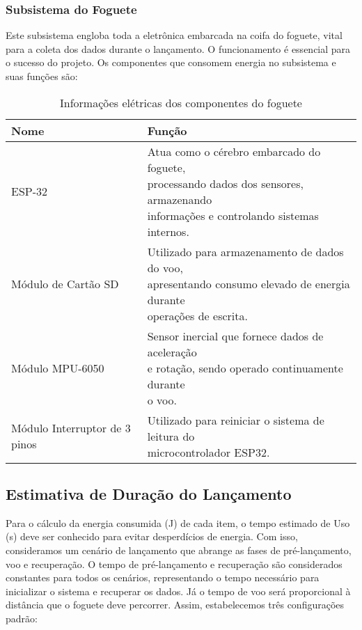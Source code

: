 \subsubsection{Subsistema do Foguete}

Este subsistema engloba toda a eletrônica embarcada na coifa do foguete, vital para a coleta dos dados durante o lançamento. O funcionamento é essencial para o sucesso do projeto. Os componentes que consomem energia no subsistema e suas funções são: 

\begin{table}[H]
    \centering
    \caption{Informações elétricas dos componentes do foguete}
    \label{tab:componentes_foguete}
    \begin{tabular}{|l|l|}
        \hline
        Nome & Função \\
        \hline
        ESP-32 & \makecell[l]{Atua como o cérebro embarcado do foguete, \\ processando dados dos sensores, armazenando \\ informações e controlando sistemas internos.} \\
		\hline
        Módulo de Cartão SD & \makecell[l]{Utilizado para armazenamento de dados do voo, \\ apresentando consumo elevado de energia durante \\ operações de escrita.} \\
		\hline
		Módulo MPU-6050 & \makecell[l]{Sensor inercial que fornece dados de aceleração \\ e rotação, sendo operado continuamente durante \\ o voo.} \\
		\hline
		Módulo Interruptor de 3 pinos & \makecell[l]{Utilizado para reiniciar o sistema de leitura do \\ microcontrolador ESP32.} \\
		\hline
    \end{tabular}
\end{table}

\subsection{Estimativa de Duração do Lançamento}

Para o cálculo da energia consumida (J) de cada item, o tempo estimado de Uso (s) deve ser conhecido para evitar desperdícios de energia. Com isso, consideramos um cenário de lançamento que abrange as fases de pré-lançamento, voo e recuperação. O tempo de pré-lançamento e recuperação são considerados constantes para todos os cenários, representando o tempo necessário para inicializar o sistema e recuperar os dados. Já o tempo de voo será proporcional à distância que o foguete deve percorrer. Assim, estabelecemos três configurações padrão: 
 
